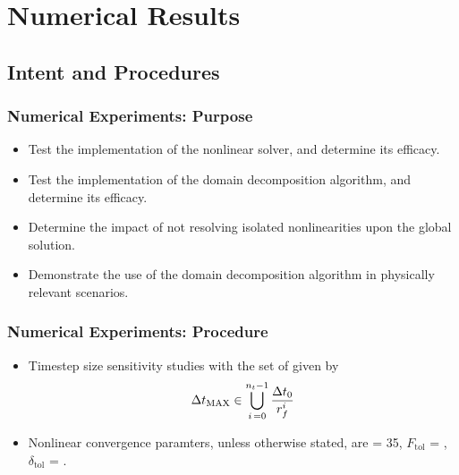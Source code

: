 \documentclass[compress,xcolor=table]{beamer}
\begin{document}
\section[Numerical Results]{Numerical Results}
\subsection[Procedures]{Intent and Procedures}
\begin{frame}
\frametitle{Numerical Experiments: Purpose}

\begin{itemize}
\item{Test the implementation of the nonlinear solver, and determine its efficacy.}
\item{Test the implementation of the domain decomposition algorithm, and determine its efficacy.}
\item{Determine the impact of not resolving isolated nonlinearities upon the global solution.}
\item{Demonstrate the use of the domain decomposition algorithm in physically relevant scenarios.}
\end{itemize}

\end{frame}
\begin{frame}
\frametitle{Numerical Experiments: Procedure}

\begin{itemize}
\item{Timestep size sensitivity studies with the set of \dtmax{} given by
\begin{equation*}
\dtmax{} \in \bigcup^{n_{t}-1}_{i\, = 0} \frac{\dt{}_{0}}{r^{i}_{f}}
\end{equation*}
}
\item{Nonlinear convergence paramters, unless otherwise stated, are \kmax{} = 35, $F_{\text{tol}}$ = , $\delta_{\text{tol}}$ = .}
\end{itemize}

\end{frame}
\end{document}
